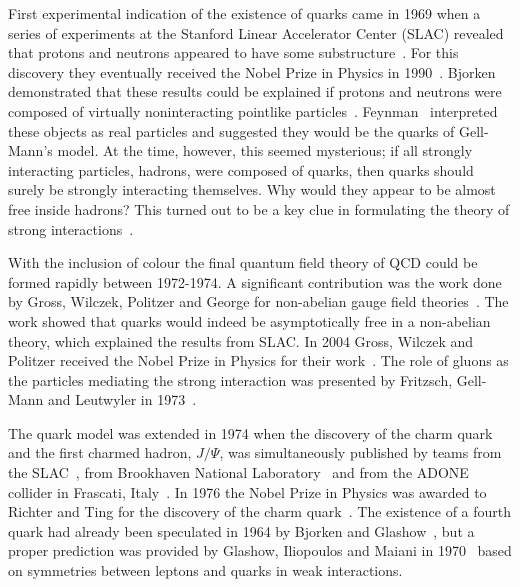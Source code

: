 First experimental indication of the existence of quarks came in 1969 when a series of experiments at the Stanford Linear Accelerator Center (SLAC) revealed that protons and neutrons appeared to have some substructure~\cite{Bloom:1969kc, Breidenbach:1969kd}. For this discovery they eventually received the Nobel Prize in Physics in 1990~\cite{Nobel1990}. Bjorken demonstrated that these results could be explained if protons and neutrons were composed of virtually noninteracting pointlike particles~\cite{Bjorken:1968dy,Bjorken:1969ja}. Feynman~\cite{Feynman:1969ej} interpreted these objects as real particles and suggested they would be the quarks of Gell-Mann's model. At the time, however, this seemed mysterious; if all strongly interacting particles, hadrons, were composed of quarks, then quarks should surely be strongly interacting themselves. Why would they appear to be almost free inside hadrons? This turned out to be a key clue in formulating the theory of strong interactions~\cite{Krauss:2017}.


With the inclusion of colour the final quantum field theory of QCD could be formed rapidly between 1972-1974. A significant contribution was the work done by Gross, Wilczek, Politzer and George for non-abelian gauge field theories~\cite{gross1973ultraviolet, politzer1973reliable, gross1973asymptotically, gross1974asymptotically, georgi1974electroproduction}. The work showed that quarks would indeed be asymptotically free in a non-abelian theory, which explained the results from SLAC. In 2004 Gross, Wilczek and Politzer received the Nobel Prize in Physics for their work~\cite{Nobel2004}. The role of gluons as the particles mediating the strong interaction was presented by Fritzsch, Gell-Mann and Leutwyler in 1973~\cite{fritzsch1973advantages}.


The quark model was extended in 1974 when the discovery of the charm quark and the first charmed hadron, $J/\Psi$, was simultaneously published by teams from the SLAC~\cite{Augustin:1974xw}, from Brookhaven National Laboratory~\cite{Aubert:1974js} and from the ADONE collider in Frascati, Italy~\cite{Bacci:1974za}. In 1976 the Nobel Prize in Physics was awarded to Richter and Ting for the discovery of the charm quark~\cite{Nobel1976}. The existence of a fourth quark had already been speculated in 1964 by Bjorken and Glashow~\cite{Bjorken:1964gz}, but a proper prediction was provided by Glashow, Iliopoulos and Maiani in 1970~\cite{Glashow:1970gm} based on symmetries between leptons and quarks in weak interactions.

